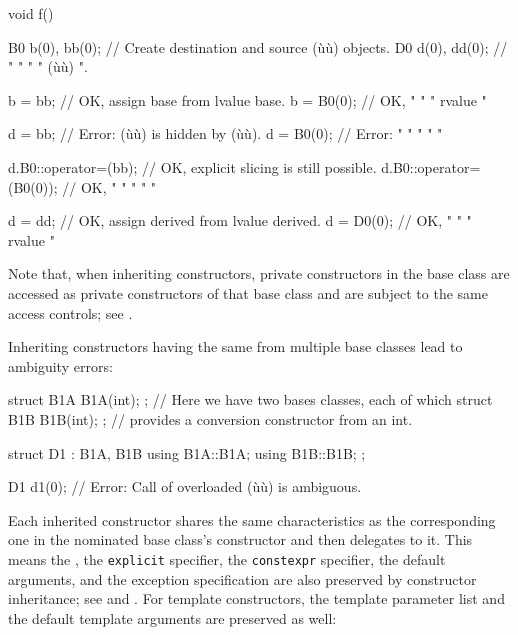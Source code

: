 \begin{emcppslisting}[language=C++]
void f()
{
    B0 b(0), bb(0);  // Create destination and source (ù{}ù) objects.
    D0 d(0), dd(0);  //   "         "       "    "    (ù{}ù)    ".

    b = bb;          // OK, assign base from lvalue base.
    b = B0(0);       // OK,   "       "   "  rvalue   "

    d = bb;          // Error: (ù{}ù) is hidden by (ù{}ù).
    d = B0(0);       // Error:       "         "    "     "        "

    d.B0::operator=(bb);     // OK, explicit slicing is still possible.
    d.B0::operator=(B0(0));  // OK,    "         "      "   "      "

    d = dd;          // OK, assign derived from lvalue derived.
    d = D0(0);       // OK,   "        "     "  rvalue    "
}
\end{emcppslisting}
    
\noindent Note that, when inheriting constructors, private constructors in the
base class are accessed as private constructors of that base class and
are subject to the same access controls; see . 

Inheriting constructors having the same  from multiple
base classes lead to ambiguity errors:

\begin{emcppslisting}[language=C++]
struct B1A { B1A(int); }; // Here we have two bases classes, each of which
struct B1B { B1B(int); }; // provides a conversion constructor from an int.

struct D1 : B1A, B1B
{
    using B1A::B1A;
    using B1B::B1B;
};

D1 d1(0);  // Error: Call of overloaded (ù{}ù) is ambiguous.
\end{emcppslisting}
    
\noindent Each inherited constructor shares the same characteristics as the
corresponding one in the nominated base class's constructor and then
delegates to it. This means the , the
\lstinline!explicit! specifier, the \lstinline!constexpr! specifier, the
default arguments, and the exception specification are also preserved by
constructor inheritance; see  and .  
For template
constructors, the template parameter list and the default template
arguments are preserved as well:

